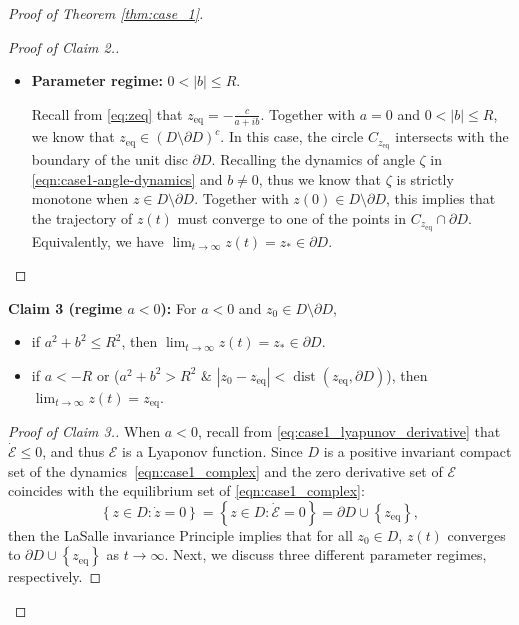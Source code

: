 \documentclass[10pt]{article}
\theoremstyle{definition}
\theoremstyle{definition}
\numberwithin{equation}{section}
\newcommand{\CE}{\mathcal{E}}
\newcommand{\zeq}{z_{\mathrm{eq}}}
\begin{document}
\begin{proof}[Proof of Theorem \ref{thm:case_1}]
\begin{proof}[Proof of Claim 2.]
\begin{itemize}
\begin{itemize}
        \end{itemize}
        \item \textbf{Parameter regime:} $0 < |b| \leq R$.
        
        Recall from \eqref{eq:zeq} that $\zeq = - \frac{c}{a + ib}$.
        Together with $a = 0$ and $0 < |b| \leq R$, we know that $\zeq \in (D \setminus \partial D)^c$.
        In this case, the circle $C_{\zeq}$ intersects with the boundary of the unit disc $\partial D$.
        Recalling the dynamics of angle $\zeta$ in \eqref{eqn:case1-angle-dynamics}
        and $b \neq 0$, thus we know that $\zeta$ is strictly monotone when $z \in D \setminus \partial D$.
        Together with $z(0) \in D \setminus \partial D$,
        this implies that the trajectory of $z(t)$ must converge to one of the points in $C_{\zeq} \cap \partial D$.
        Equivalently, we have $\lim_{t \to \infty} z(t) = z_* \in \partial D$.
        \end{itemize}
\end{proof}
    
\textbf{Claim 3 (regime $a < 0$):} For $a < 0$ and $z_0 \in D \setminus \partial D$, 
    \begin{itemize}
    \item if $a^2+b^2 \leq R^2$, then $\lim_{t\to\infty} z(t) = z_* \in \partial D$.
    
    \item if $a < -R$ or ($a^2+b^2 > R^2$ $\&$ $|z_0-z_{\mathrm{eq}}| < \operatorname{dist}(z_{\mathrm{eq}},\partial D)$), then $\lim_{t\to\infty} z(t) = z_{\mathrm{eq}}$.
    \end{itemize}
    
    \begin{proof}[Proof of Claim 3.]
        When $a<0$, recall from \eqref{eq:case1_lyapunov_derivative} that $\dot{\CE} \leq 0$, and thus $\CE$ is a Lyaponov function.  
        Since $D$ is a positive invariant compact set of the dynamics~\eqref{eqn:case1_complex} and the zero derivative set of $\CE$ coincides with the equilibrium set of \eqref{eqn:case1_complex}:
        \begin{equation*}
        \left\{ z \in D: \Dot{z} = 0 \right\} = \left\{ z \in D: \Dot{\CE} = 0 \right\} = \partial D \cup \left\{ \zeq \right\},
        \end{equation*}
        then the LaSalle invariance Principle implies that for all $z_0 \in D$, $z(t)$ converges to $\partial D \cup \left\{ \zeq \right\}$ as $t \rightarrow \infty$.
        Next, we discuss three different parameter regimes, respectively.


\end{proof}
\end{proof}
\end{document}
